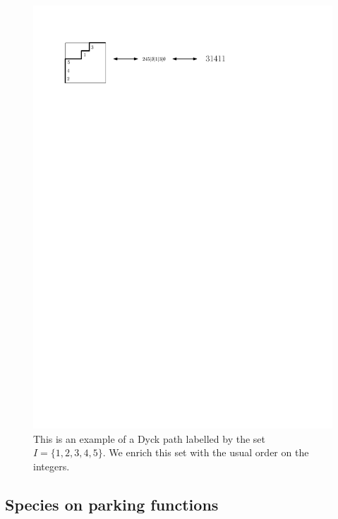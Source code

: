 \documentclass[12pt, reqno]{amsart}
\theoremstyle{definition}
\begin{document}
\begin{figure}
    \centering
    \includegraphics{../images/correspondence_parking.pdf}
    \caption{This is an example of a Dyck path labelled by the set $I =\{1, 2, 3, 4, 5\}$. We enrich this set with the usual order on the integers.}
    \label{fig:construction_parking}
\end{figure}


\subsection{Species on parking functions}
\end{document}
